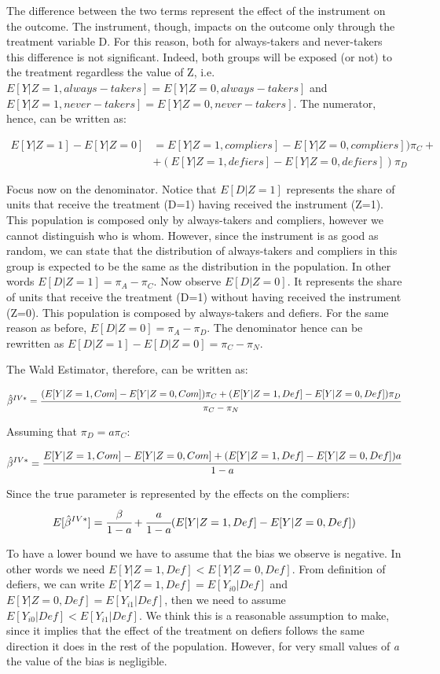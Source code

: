 \documentclass[a4paper,12pt,oneside,English]{article}
\begin{document}
The difference between the two terms represent the effect of the instrument on the outcome. The instrument, though, impacts on the outcome only through the treatment variable D. For this reason, both for always-takers and never-takers this difference is not significant. Indeed, both groups will be exposed (or not) to the treatment regardless the value of Z, i.e. $E[Y|Z=1,always-takers]=E[Y|Z=0,always-takers]$ and $E[Y|Z=1,never-takers]=E[Y|Z=0,never-takers]$. The numerator, hence, can be written as:

\[
\begin{split}
E[Y|Z=1]-E[Y|Z=0]&=E[Y|Z=1,compliers]-E[Y|Z=0,compliers])\pi_C+\\&+(E[Y|Z=1,defiers]-E[Y|Z=0,defiers])\pi_D
\end{split}
\]

Focus now on the denominator. Notice that $E[D|Z=1]$ represents the share of units that receive the treatment (D=1) having received the instrument (Z=1). This population is composed only by always-takers and compliers, however we cannot distinguish who is whom. However, since the instrument is as good as random, we can state that the distribution of always-takers and compliers in this group is expected to be the same as the distribution in the population. In other words $E[D|Z=1]=\pi_A-\pi_C$. Now observe $E[D|Z=0]$. It represents the share of units that receive the treatment (D=1) without having received the instrument (Z=0). This population is composed by always-takers and defiers. For the same reason as before, $E[D|Z=0]=\pi_A-\pi_D$. The denominator hence can be rewritten as $E[D|Z=1]-E[D|Z=0]=\pi_C-\pi_N$.

The Wald Estimator, therefore, can be written as:

\[
\hat\beta^{IV*}=\cfrac{(E[Y|Z=1,Com]-E[Y|Z=0,Com])\pi_C+(E[Y|Z=1,Def]-E[Y|Z=0,Def])\pi_D}{\pi_C-\pi_N}
\]

Assuming that $\pi_D=a\pi_C$:

\[
\hat\beta^{IV*}=\cfrac{E[Y|Z=1,Com]-E[Y|Z=0,Com]+(E[Y|Z=1,Def]-E[Y|Z=0,Def])a}{1-a}
\]

Since the true parameter is represented by the effects on the compliers:
\[
E[\hat\beta^{IV*}]=\cfrac{\beta}{1-a}+\cfrac{a}{1-a}(E[Y|Z=1,Def]-E[Y|Z=0,Def])
\]

To have a lower bound we have to assume that the bias we observe is negative. In other words we need $E[Y|Z=1,Def]<E[Y|Z=0,Def]$. From definition of defiers, we can write $E[Y|Z=1, Def]=E[Y_{i0}|Def]$ and $E[Y|Z=0, Def]=E[Y_{i1}|Def]$, then we need to assume $E[Y_{i0}|Def]<E[Y_{i1}|Def]$. We think this is a reasonable assumption to make, since it implies that the effect of the treatment on defiers follows the same direction it does in the rest of the population. However, for very small values of \textit{a} the value of the bias is negligible.
\end{document}
